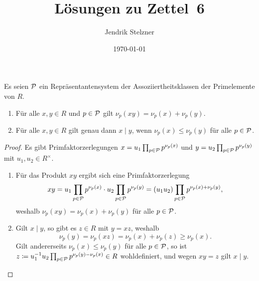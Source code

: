 \documentclass[a4paper,10pt,numbers=noenddot]{scrartcl}
\title{Lösungen zu Zettel~6}
\author{Jendrik Stelzner}
\date{\today}
\begin{document}
\maketitle





\section{}

Es seien $\mathcal{P}$ ein Repräsentantensystem der Assoziiertheitsklassen der Primelemente von $R$.

\begin{lemma}
  \label{lemma: divisability via prime factors}
  \begin{enumerate}
    \item
      Für alle $x, y \in R$ und $p \in \mathcal{P}$ gilt $\nu_p(x y) = \nu_p(x) + \nu_p(y)$.
    \item
      Für alle $x, y \in R$ gilt genau dann $x \mid y$, wenn $\nu_p(x) \leq \nu_p(y)$ für alle $p \in \mathcal{P}$.
  \end{enumerate}
\end{lemma}

\begin{proof}
  Es gibt Primfaktorzerlegungen $x  = u_1 \prod_{p \in \mathcal{P}} p^{\nu_p(x)}$ und $y = u_2 \prod_{p \in \mathcal{P}} p^{\nu_p(y)}$ mit $u_1, u_2 \in R^\times$.
  \begin{enumerate}
    \item
      Für das Produkt $x y$ ergibt sich eine Primfaktorzerlegung
      \[
          x y
        = u_1 \prod_{p \in \mathcal{P}} p^{\nu_p(x)} \cdot u_2 \prod_{p \in \mathcal{P}} p^{\nu_p(y)}
        = (u_1 u_2) \prod_{p \in \mathcal{P}} p^{\nu_p(x) + \nu_p(y)},
      \]
      weshalb $\nu_p(x y) = \nu_p(x) + \nu_p(y)$ für alle $p \in \mathcal{P}$.
    \item
      Gilt $x \mid y$, so gibt es $z \in R$ mit $y = x z$, weshalb
      \[
              \nu_p(y)
        =     \nu_p(x z)
        =     \nu_p(x) + \nu_p(z)
        \geq  \nu_p(x).
      \]
      Gilt andererseits $\nu_p(x) \leq \nu_p(y)$ für alle $p \in \mathcal{P}$, so ist $z \coloneqq u_1^{-1} u_2 \prod_{p \in \mathcal{P}} p^{\nu_p(y) - \nu_p(x)} \in R$ wohldefiniert, und wegen $xy = z$ gilt $x \mid y$.
    \qedhere
  \end{enumerate}
\end{proof}
\end{document}
